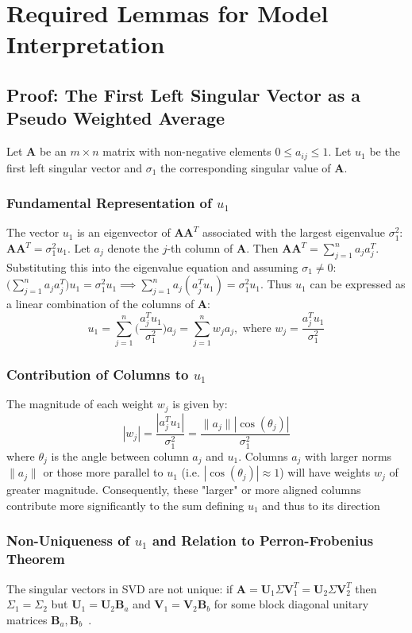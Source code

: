 \chapter{Required Lemmas for Model Interpretation}

\section{Proof: The First Left Singular Vector as a Pseudo Weighted Average}
Let $\mathbf{A}$ be an $m \times n$ matrix with non-negative elements $0 \leq
a_{ij} \leq 1$. Let $u_1$ be the first left singular vector and $\sigma_1$ the
corresponding singular value of $\mathbf{A}$.

\subsection{Fundamental Representation of $u_1$}
The vector $u_1$ is an eigenvector of $\mathbf{AA}^T$ associated with the
largest eigenvalue $\sigma_1^2$: $\mathbf{AA}^T = \sigma_1^2 u_1$. Let $a_j$
denote the $j$-th column of $\mathbf{A}$. Then $\mathbf{AA}^T = \sum_{j=1}^n a_j
a_j^T$. Substituting this into the eigenvalue equation and assuming $\sigma_1
\neq 0$: $\big( \sum_{j = 1}^n a_j a_j^T\big) u_1 = \sigma_1^2 u_1 \implies
\sum_{j=1}^n a_j (a_j^T u_1) = \sigma_1^2 u_1$. Thus $u_1$ can be expressed as a
linear combination of the columns of $\mathbf{A}$:
\[ u_1 = \sum_{j=1}^n \bigg(\frac{a_j^T u_1}{\sigma_1^2}\bigg) a_j =
\sum_{j=1}^n w_j a_j, \text{  where } w_j = \frac{a_j^T u_1}{\sigma_1^2} \]

\subsection{Contribution of Columns to $u_1$}
The magnitude of each weight $w_j$ is given by:
\[ |w_j| = \frac{|a_j^T u_1|}{\sigma_1^2} = \frac{\parallel a_j\parallel
|\cos(\theta_j)|}{\sigma_1^2}\]
where $\theta_j$ is the angle between column $a_j$ and $u_1$. Columns $a_j$ with
larger norms $\parallel a_j \parallel$ or those more parallel to $u_1$ (i.e.
$|\cos(\theta_j)| \approx 1$) will have weights $w_j$ of greater magnitude.
Consequently, these "larger" or more aligned columns contribute more
significantly to the sum defining $u_1$ and thus to its direction

\subsection{Non-Uniqueness of $u_1$ and Relation to Perron-Frobenius Theorem}
The singular vectors in SVD are not unique: if $\mathbf{A} =
\mathbf{U}_1\Sigma\mathbf{V}_1^T = \mathbf{U}_2\Sigma\mathbf{V}_2^T$ then
$\Sigma_1 = \Sigma_2$ but $\mathbf{U}_1 = \mathbf{U}_2\mathbf{B}_a$ and
$\mathbf{V}_1 = \mathbf{V}_2\mathbf{B}_b$ for some block diagonal unitary
matrices $\mathbf{B}_a, \mathbf{B}_b$~\cite{eftekhari2019moses}.

